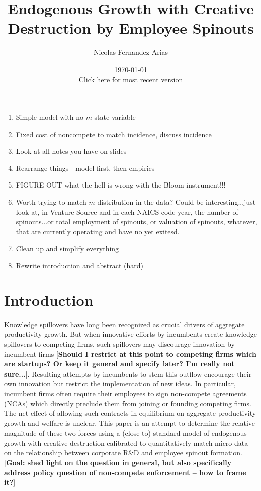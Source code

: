 \documentclass[12pt,english]{article}
\theoremstyle{remark}
\begin{document}
	
\title{Endogenous Growth with Creative Destruction by Employee Spinouts}
\author{Nicolas Fernandez-Arias}
\date{\today \\ \small
	\href{https://drive.google.com/open?id=1NZCBFnkxug8qXWAZLTir6dEmIy9LuEBg}{Click here for most recent version}}
\maketitle

\begin{abstract}

	
\end{abstract}


\begin{enumerate}
	\item Simple model with no $m$ state variable
	\item Fixed cost of noncompete to match incidence, discuss incidence
	\item Look at all notes you have on slides
	\item Rearrange things - model first, then empirics
	\item FIGURE OUT what the hell is wrong with the Bloom instrument!!!
	\item Worth trying to match $m$ distribution in the data? Could be interesting...just look at, in Venture Source and in each NAICS code-year, the number of spinouts...or total employment of spinouts, or valuation of spinouts, whatever, that are currently operating and have no yet exitesd.
	\item Clean up and simplify everything
	\item Rewrite introduction and abstract (hard)
\end{enumerate}

\section{Introduction}

Knowledge spillovers have long been recognized as crucial drivers of aggregate productivity growth. But when innovative efforts by incumbents create knowledge spillovers to competing firms, such spillovers may discourage innovation by incumbent firms [\textbf{Should I restrict at this point to competing firms which are startups? Or keep it general and specify later? I'm really not sure...}]. Resulting attempts by incumbents to stem this outflow encourage their own innovation but restrict the implementation of new ideas. In particular, incumbent firms often require their employees to sign non-compete agreements (NCAs) which directly preclude them from joining or founding competing firms. The net effect of allowing such contracts in equilibrium on aggregate productivity growth and welfare is unclear. This paper is an attempt to determine the relative magnitude of these two forces using a (close to) standard model of endogenous growth with creative destruction calibrated to quantitatively match micro data on the relationship between corporate R\&D and employee spinout formation. [\textbf{Goal: shed light on the question in general, but also specifically address policy question of non-compete enforcement -- how to frame it?}]
\end{document}
